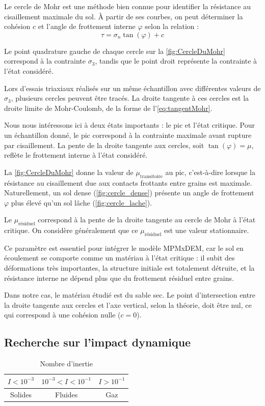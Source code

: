 \documentclass[a4paper,12pt]{report}
\begin{document}
Le cercle de Mohr est une méthode bien connue pour identifier la résistance au cisaillement maximale du sol.  
À partir de ses courbes, on peut déterminer la cohésion $c$ et l’angle de frottement interne $\varphi$ selon la relation :
\begin{equation}
    \tau = \sigma_n \tan(\varphi) + c
    \label{eq:tangentMohr}
\end{equation}

Le point quadrature gauche de chaque cercle sur la \autoref{fig:CercleDuMohr} correspond à la contrainte $\sigma_3$, tandis que le point droit représente la contrainte à l’état considéré.  

Lors d’essais triaxiaux réalisés sur un même échantillon avec différentes valeurs de $\sigma_3$, plusieurs cercles peuvent être tracés. La droite tangente à ces cercles est la droite limite de Mohr-Coulomb, de la forme de l'\autoref{eq:tangentMohr}.  

Nous nous intéressons ici à deux états importants : le pic et l’état critique.  
Pour un échantillon donné, le pic correspond à la contrainte maximale avant rupture par cisaillement.  
La pente de la droite tangente aux cercles, soit $\tan(\varphi) = \mu$, reflète le frottement interne à l’état considéré.  

La \autoref{fig:CercleDuMohr} donne la valeur de $\mu_{\text{transitoire}}$ au pic, c’est-à-dire lorsque la résistance au cisaillement due aux contacts frottants entre grains est maximale.  
Naturellement, un sol dense (\autoref{fig:cercle_dense}) présente un angle de frottement $\varphi$ plus élevé qu’un sol lâche (\autoref{fig:cercle_lache}).  

Le $\mu_{\text{résiduel}}$ correspond à la pente de la droite tangente au cercle de Mohr à l’état critique.  
On considère généralement que ce $\mu_{\text{résiduel}}$ est une valeur stationnaire.  

Ce paramètre est essentiel pour intégrer le modèle MPMxDEM, car le sol en écoulement se comporte comme un matériau à l’état critique :  
il subit des déformations très importantes, la structure initiale est totalement détruite, et la résistance interne ne dépend plus que du frottement résiduel entre grains.  

Dans notre cas, le matériau étudié est du sable sec. Le point d’intersection entre la droite tangente aux cercles et l’axe vertical, selon la théorie, doit être nul, ce qui correspond à une cohésion nulle ($c=0$).

\subsection{Recherche sur l'impact dynamique} \label{sec:dynamique}
\begin{table}[h!]
\centering
\begin{tabular}{|c|c|c|}
\hline
$ I < 10^{-3} $ & $ 10^{-3} < I < 10^{-1} $ & $ I > 10^{-1} $ \\ 
\hline
Solides & Fluides & Gaz \\  
\hline
\end{tabular}
\caption{Nombre d’inertie}
\label{tab:nombreInertie}
\end{table}
\end{document}
